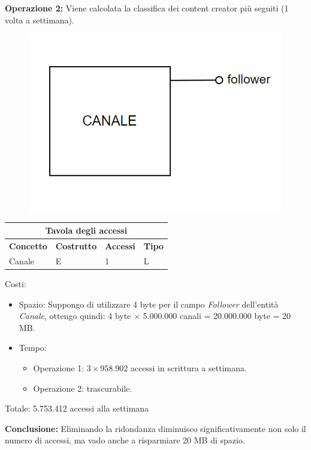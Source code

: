 \textbf{Operazione 2:} Viene calcolata la classifica dei content creator più seguiti (1 volta a settimana).
\begin{figure}[h]
    \centering
    \includegraphics[scale = 0.5]{img/ridondanza22.png}
\end{figure}
\begin{center}
\begin{tabular}{|p{3cm}|p{3cm}|p{3cm}|p{3cm}|}
\hline
\multicolumn{4}{|c|}{\textbf{Tavola degli accessi}}\\
\hline
 \multicolumn{1}{|c|}{\textbf{Concetto}} 
 & \multicolumn{1}{|c|}{\textbf{Costrutto}}
 & \multicolumn{1}{|c|}{\textbf{Accessi}}
 & \multicolumn{1}{|c|}{\textbf{Tipo}}\\
 \hline
  Canale & E & 1 & L\\
 \hline
\end{tabular}
\end{center}
\newpage
Costi:
\begin{itemize}
    \item Spazio: Suppongo di utilizzare 4 byte per il campo \textit{Follower} dell'entità \textit{Canale}, ottengo quindi: 4 byte $\times$ 5.000.000 canali = 20.000.000 byte = 20 MB.
    \item Tempo:
    \begin{itemize}
        \item Operazione 1: $3 \times 958.902$ accessi in scrittura a settimana.
        \item Operazione 2: trascurabile.
    \end{itemize}
\end{itemize}
Totale: 5.753.412 accessi alla settimana

\textbf{Conclusione: } Eliminando la ridondanza diminuisco significativamente non solo il numero di accessi, ma vado anche a risparmiare 20 MB di spazio.








